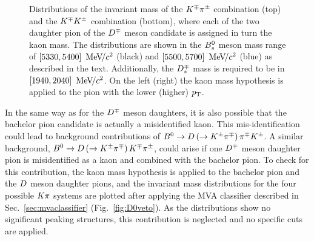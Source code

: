 \begin{figure}[t]
\begin{center}
	\end{center}
        \vspace{-2mm}
	\caption{Distributions of the invariant mass of the $K^\mp\pi^\pm$ combination (top) and
	the $K^\mp K^\pm$ combination (bottom), where each of the two daughter pion of the
	$D^\mp$ meson candidate is assigned in turn the kaon mass. The distributions are shown in the $B^0_s$ meson mass range of $[5330,5400]~{\mathrm{\,Me\kern -0.1em V\!/}c^2}$
	(black) and $[5500,5700]~{\mathrm{\,Me\kern -0.1em V\!/}c^2}$ (blue) as described in the text.
	Additionally, the $D^{\mp}_s$ mass is required to be in
	$[1940,2040]~{\mathrm{\,Me\kern -0.1em V\!/}c^2}$. On the left (right) the kaon mass
	hypothesis is applied to the pion with the lower (higher) $\mbox{$p_{\rm T}$}$.}
	\label{fig:KstarAndPhi}
\end{figure}
%
In the same way as for the $D^\mp$ meson daughters, it is also possible that the
bachelor pion candidate is actually a misidentified kaon. This mis-identification could lead
to background contributions of
\mbox{$B^0\rightarrow D\left(\rightarrow K^\pm\pi^\mp\right)\pi^\mp K^\pm$}. A similar background, \mbox{$B^0\rightarrow D\left(\rightarrow K^\pm\pi^\mp\right)K^\mp\pi^\pm$},
could arise if one $D^\mp$ meson daughter pion is misidentified as a
kaon and combined with the bachelor pion. To check for this contribution, the
kaon mass hypothesis is applied to the bachelor pion and the $D$ meson daughter
pions, and the invariant mass distributions for the four possible $K\pi$
systems are plotted after applying the MVA classifier described in Sec.~\ref{sec:mvaclassifier} (Fig.~\ref{fig:D0veto}). As the
distributions show no significant peaking structures, this
contribution is neglected and no specific
cuts are applied.
%
